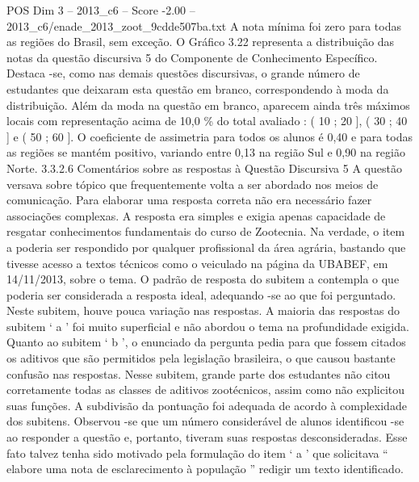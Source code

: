 \begin{textsample}{POS Dim 3 – 2013\_c6 – Score -2.00 – 2013\_c6/enade\_2013\_zoot\_9cdde507ba.txt}
A nota mínima foi zero para todas as regiões do Brasil, sem exceção.
O Gráfico 3.22 representa a distribuição das notas da questão discursiva 5 do Componente de Conhecimento Específico.
Destaca -se, como nas demais questões discursivas, o grande número de estudantes que deixaram esta questão em branco, correspondendo à moda da distribuição.
Além da moda na questão em branco, aparecem ainda três máximos locais com representação acima de 10,0 \% do total avaliado : ( 10 ; 20 ], ( 30 ; 40 ] e ( 50 ; 60 ].
O coeficiente de assimetria para todos os alunos é 0,40 e para todas as regiões se mantém positivo, variando entre 0,13 na região Sul e 0,90 na região Norte. 3.3.2.6 Comentários sobre as respostas à Questão Discursiva 5 A questão versava sobre tópico que frequentemente volta a ser abordado nos meios de comunicação.
Para elaborar uma resposta correta não era necessário fazer associações complexas.
A resposta era simples e exigia apenas capacidade de resgatar conhecimentos fundamentais do curso de Zootecnia.
Na verdade, o item a poderia ser respondido por qualquer profissional da área agrária, bastando que tivesse acesso a textos técnicos como o veiculado na página da UBABEF, em 14/11/2013, sobre o tema.
O padrão de resposta do subitem a contempla o que poderia ser considerada a resposta ideal, adequando -se ao que foi perguntado.
Neste subitem, houve pouca variação nas respostas.
A maioria das respostas do subitem ‘ a ’ foi muito superficial e não abordou o tema na profundidade exigida.
Quanto ao subitem ‘ b ’, o enunciado da pergunta pedia para que fossem citados os aditivos que são permitidos pela legislação brasileira, o que causou bastante confusão nas respostas.
Nesse subitem, grande parte dos estudantes não citou corretamente todas as classes de aditivos zootécnicos, assim como não explicitou suas funções.
A subdivisão da pontuação foi adequada de acordo à complexidade dos subitens.
Observou -se que um número considerável de alunos identificou -se ao responder a questão e, portanto, tiveram suas respostas desconsideradas.
Esse fato talvez tenha sido motivado pela formulação do item ‘ a ’ que solicitava “ elabore uma nota de esclarecimento à população ” redigir um texto identificado.

\end{textsample}
